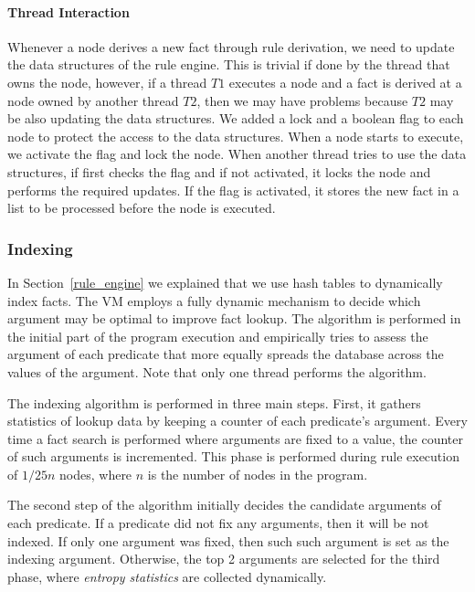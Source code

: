 \paragraph{Thread Interaction}

Whenever a node derives a new fact through rule derivation, we need to update the data structures of the rule engine.
This is trivial if done by the thread that owns the node, however, if a thread $T1$ executes a node and a fact is derived
at a node owned by another thread $T2$, then we may have problems because $T2$ may be also updating the data structures.
We added a lock and a boolean flag to each node to protect the access to the data structures. When a node starts to execute,
we activate the flag and lock the node. When another thread tries to use the data structures, if first checks the flag and if
not activated, it locks the node and performs the required updates. If the flag is activated, it stores the new fact
in a list to be processed before the node is executed.

\subsubsection{Indexing}\label{indexing}

In Section~\ref{rule_engine} we explained that we use hash tables to dynamically index facts.
The VM employs a fully dynamic mechanism to decide which argument may be optimal to improve fact lookup.
The algorithm is performed in the initial part of the program execution and empirically tries to assess the argument
of each predicate that more equally spreads the database across the values of the argument. Note that only one thread
performs the algorithm.

The indexing algorithm is performed in three main steps. First, it gathers statistics of lookup data by keeping a counter
of each predicate's argument.
Every time a fact search is performed where arguments are fixed to a value, the counter of such arguments is incremented. This phase is performed during rule execution of $1/25n$ nodes, where $n$ is the number of nodes in the program.

The second step of the algorithm initially decides the candidate arguments of each predicate.
If a predicate did not fix any arguments, then it will be not indexed.
If only one argument was fixed, then such such argument is set as the indexing argument. Otherwise, the top 2 arguments
are selected for the third phase, where \emph{entropy statistics} are collected dynamically.

